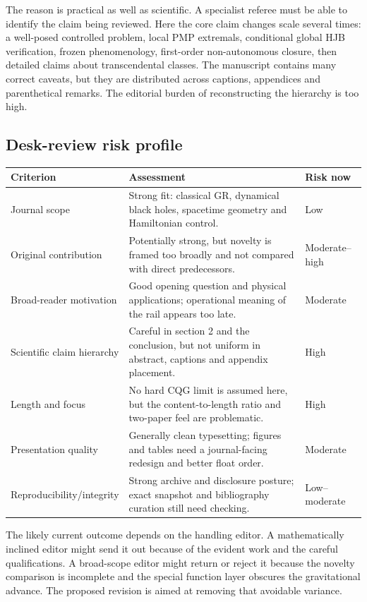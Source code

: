 \documentclass[11pt,a4paper]{article}
\begin{document}
The reason is practical as well as scientific.  A specialist referee must be able to identify the
claim being reviewed.  Here the core claim changes scale several times: a well-posed controlled
problem, local PMP extremals, conditional global HJB verification, frozen phenomenology,
first-order non-autonomous closure, then detailed claims about transcendental classes.  The
manuscript contains many correct caveats, but they are distributed across captions, appendices
and parenthetical remarks.  The editorial burden of reconstructing the hierarchy is too high.

\subsection{Desk-review risk profile}

\begin{tabularx}{\textwidth}{@{}p{}X p{}@{}}
\toprule
Criterion & Assessment & Risk now \\
\midrule
Journal scope & Strong fit: classical GR, dynamical black holes, spacetime geometry and
Hamiltonian control. & Low \\
Original contribution & Potentially strong, but novelty is framed too broadly and not compared
with direct predecessors. & Moderate--high \\
Broad-reader motivation & Good opening question and physical applications; operational meaning
of the rail appears too late. & Moderate \\
Scientific claim hierarchy & Careful in section 2 and the conclusion, but not uniform in abstract,
captions and appendix placement. & High \\
Length and focus & No hard CQG limit is assumed here, but the content-to-length ratio and two-paper
feel are problematic. & High \\
Presentation quality & Generally clean typesetting; figures and tables need a journal-facing
redesign and better float order. & Moderate \\
Reproducibility/integrity & Strong archive and disclosure posture; exact snapshot and bibliography
curation still need checking. & Low--moderate \\
\bottomrule
\end{tabularx}

The likely current outcome depends on the handling editor.  A mathematically inclined editor
might send it out because of the evident work and the careful qualifications.  A broad-scope
editor might return or reject it because the novelty comparison is incomplete and the special
function layer obscures the gravitational advance.  The proposed revision is aimed at removing
that avoidable variance.
\end{document}
